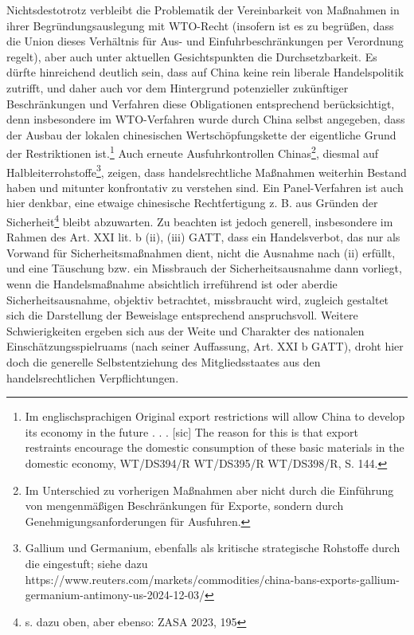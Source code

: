 \documentclass[12pt,a4paper,oneside]{book} %
\begin{document}
{	Nichtsdestotrotz verbleibt die Problematik der Vereinbarkeit von Maßnahmen in ihrer Begründungsauslegung mit WTO-Recht (insofern ist es zu begrüßen, dass die Union dieses Verhältnis für Aus- und Einfuhrbeschränkungen per Verordnung regelt), aber auch unter aktuellen Gesichtspunkten die Durchsetzbarkeit. Es dürfte hinreichend deutlich sein, dass auf China keine rein liberale Handelspolitik zutrifft, und daher auch vor dem Hintergrund potenzieller zukünftiger Beschränkungen und Verfahren diese Obligationen entsprechend berücksichtigt, denn insbesondere im WTO-Verfahren wurde durch China selbst angegeben, dass der Ausbau der lokalen chinesischen Wertschöpfungskette der eigentliche Grund der Restriktionen ist.\footnote{Im englischsprachigen Original \glqq [...]  export restrictions will allow China to develop its economy in the future . . . [sic] The reason for this is that export restraints encourage the domestic consumption of these basic materials in the domestic economy\grqq, WT/DS394/R WT/DS395/R WT/DS398/R, S. 144.} 
	Auch erneute Ausfuhrkontrollen Chinas\footnote{Im Unterschied zu vorherigen Maßnahmen aber nicht durch die Einführung von mengenmäßigen Beschränkungen für Exporte, sondern durch Genehmigungsanforderungen für Ausfuhren.}, diesmal auf Halbleiterrohstoffe\footnote{Gallium und Germanium, ebenfalls als kritische strategische Rohstoffe durch die eingestuft; siehe dazu https://www.reuters.com/markets/commodities/china-bans-exports-gallium-germanium-antimony-us-2024-12-03/}, zeigen, dass handelsrechtliche Maßnahmen weiterhin Bestand haben und mitunter konfrontativ zu verstehen sind.\autocite{ZASA 2023, 195} Ein Panel-Verfahren ist auch hier denkbar, eine etwaige chinesische Rechtfertigung z. B. aus Gründen der Sicherheit\footnote{s. dazu oben, aber ebenso: ZASA 2023, 195} bleibt abzuwarten. Zu beachten ist jedoch generell, insbesondere im Rahmen des Art. XXI lit. b (ii), (iii) GATT, dass ein Handelsverbot, das nur als Vorwand für Sicherheitsmaßnahmen dient, nicht die Ausnahme nach (ii) erfüllt, und eine Täuschung bzw. ein Missbrauch der Sicherheitsausnahme dann vorliegt, wenn  die Handelsmaßnahme absichtlich irreführend ist oder aberdie Sicherheitsausnahme, objektiv betrachtet, missbraucht wird, zugleich gestaltet sich die Darstellung der Beweislage entsprechend anspruchsvoll.\autocites{ZASA 2023, 195, 197}{Ikeda, K.: A Proposed Interpretation of GATT Article XXI (b) (ii) in Light of its Implications for Export Control} Weitere Schwierigkeiten ergeben sich aus der Weite und Charakter des nationalen Einschätzungsspielruams (\glqq nach seiner Auffassung\grqq, Art. XXI b GATT), droht hier doch die generelle Selbstentziehung des Mitgliedsstaates aus den handelsrechtlichen Verpflichtungen.\autocite[Ausführlich]{Herdegen, Internationales Wirtschaftsrecht, Rn. 81ff.}
}
\end{document}
